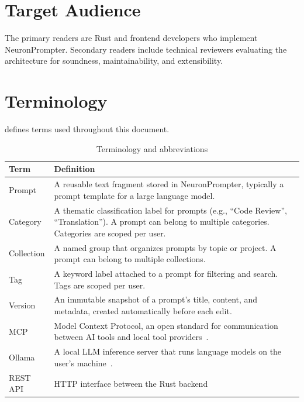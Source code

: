 \documentclass[a4paper, 11pt, oneside]{report}
\begin{document}
\section{Target Audience}
\label{sec:audience}

The primary readers are Rust and frontend developers who implement
NeuronPrompter.  Secondary readers include technical reviewers evaluating the
architecture for soundness, maintainability, and extensibility.

\section{Terminology}
\label{sec:terminology}

 defines terms used throughout this document.

\begin{table}[H]
  \centering
  \caption{Terminology and abbreviations}
  \label{tab:terminology}
  \begin{tabularx}{\textwidth}{l X}
    \toprule
    \textbf{Term} & \textbf{Definition} \\
    \midrule
    Prompt        & A reusable text fragment stored in NeuronPrompter, typically
                    a prompt template for a large language model. \\
    Category      & A thematic classification label for prompts (e.g.,
                    ``Code Review'', ``Translation'').  A prompt can belong
                    to multiple categories.  Categories are scoped per user. \\
    Collection    & A named group that organizes prompts by topic or project.
                    A prompt can belong to multiple collections. \\
    Tag           & A keyword label attached to a prompt for filtering and
                    search.  Tags are scoped per user. \\
    Version       & An immutable snapshot of a prompt's title, content, and
                    metadata, created automatically before each edit. \\
    MCP           & Model Context Protocol, an open standard for communication
                    between AI tools and local tool
                    providers~\cite{mcp_spec}. \\
    Ollama        & A local LLM inference server that runs language models
                    on the user's machine~\cite{ollama}. \\
    REST API      & HTTP interface between the Rust backend

\end{tabularx}
\end{table}
\end{document}

